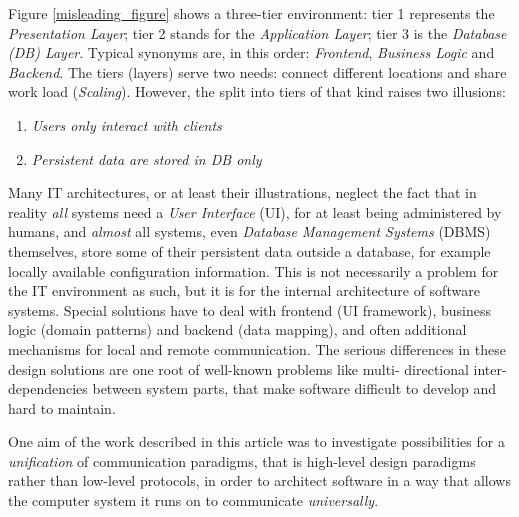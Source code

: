 Figure \ref{misleading_figure} shows a three-tier environment: tier 1 represents
the \emph{Presentation Layer}; tier 2 stands for the \emph{Application Layer};
tier 3 is the \emph{Database (DB) Layer}. Typical synonyms are, in this order:
\emph{Frontend}, \emph{Business Logic} and \emph{Backend}. The tiers (layers)
serve two needs: connect different locations and share work load (\emph{Scaling}).
However, the split into tiers of that kind raises two illusions:

\begin{enumerate}
    \item \emph{Users only interact with clients}
    \item \emph{Persistent data are stored in DB only}
\end{enumerate}

Many IT architectures, or at least their illustrations, neglect the fact that
in reality \emph{all} systems need a \emph{User Interface} (UI), for at least
being administered by humans, and \emph{almost} all systems, even
\emph{Database Management Systems} (DBMS) themselves, store some of their
persistent data outside a database, for example locally available configuration
information. This is not necessarily a problem for the IT environment as such,
but it is for the internal architecture of software systems. Special solutions
have to deal with frontend (UI framework), business logic (domain patterns) and
backend (data mapping), and often additional mechanisms for local and remote
communication. The serious differences in these design solutions are one root
of well-known problems like multi- directional inter-dependencies between system
parts, that make software difficult to develop and hard to maintain.

One aim of the work described in this article was to investigate possibilities
for a \emph{unification} of communication paradigms, that is high-level design
paradigms rather than low-level protocols, in order to architect software in a
way that allows the computer system it runs on to communicate \emph{universally}.

